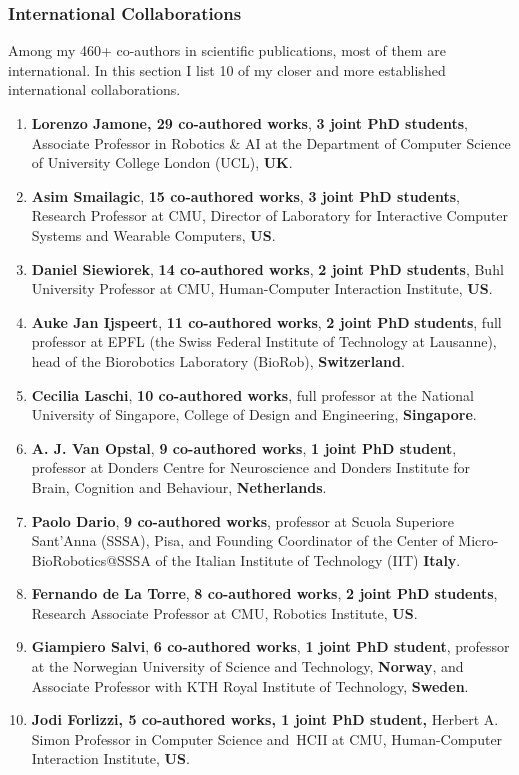 \clearpage

\subsubsection{International
Collaborations}\label{international-collaborations}

Among my 460+ co-authors in scientific publications, most of them are
international. In this section I list 10 of my closer and more
established international collaborations.

\begin{enumerate}
\def\labelenumi{\arabic{enumi}.}
\item
  \textbf{Lorenzo Jamone, 29 co-authored works}, \textbf{3 joint PhD
  students}, Associate Professor in Robotics \& AI at the Department of
  Computer Science of University College London (UCL), \textbf{UK}.
\item
  \textbf{Asim Smailagic}, \textbf{15 co-authored works}, \textbf{3
  joint PhD students}, Research Professor at CMU, Director of Laboratory
  for Interactive Computer Systems and Wearable Computers, \textbf{US}.
\item
  \textbf{Daniel Siewiorek}, \textbf{14 co-authored works}, \textbf{2
  joint PhD students}, Buhl University Professor at CMU, Human-Computer
  Interaction Institute, \textbf{US}.
\item
  \textbf{Auke Jan Ijspeert}, \textbf{11 co-authored works}, \textbf{2
  joint PhD} \textbf{students}, full professor at EPFL (the Swiss
  Federal Institute of Technology at Lausanne), head of the Biorobotics
  Laboratory (BioRob), \textbf{Switzerland}.
\item
  \textbf{Cecilia Laschi}, \textbf{10 co-authored works}, full professor
  at the National University of Singapore, College of Design and
  Engineering, \textbf{Singapore}.
\item
  \textbf{A. J. Van Opstal}, \textbf{9 co-authored works}, \textbf{1
  joint PhD student}, professor at Donders Centre for Neuroscience and
  Donders Institute for Brain, Cognition and Behaviour,
  \textbf{Netherlands}.
\item
  \textbf{Paolo Dario}, \textbf{9 co-authored works}, professor at
  Scuola Superiore Sant'Anna (SSSA), Pisa, and Founding Coordinator of
  the Center of Micro-BioRobotics@SSSA of the Italian Institute of
  Technology (IIT) \textbf{Italy}.
\item
  \textbf{Fernando de La Torre}, \textbf{8 co-authored works}, \textbf{2
  joint PhD students}, Research Associate Professor at CMU, Robotics
  Institute, \textbf{US}.
\item
  \textbf{Giampiero Salvi}, \textbf{6 co-authored works}, \textbf{1
  joint PhD student}, professor at the Norwegian University of Science
  and Technology, \textbf{Norway}, and Associate Professor with KTH
  Royal Institute of Technology, \textbf{Sweden}.
\item
  \textbf{Jodi Forlizzi, 5 co-authored works, 1 joint PhD student,}
  Herbert A. Simon Professor in Computer Science and~HCII at CMU,
  Human-Computer Interaction Institute, \textbf{US}.
\end{enumerate}

